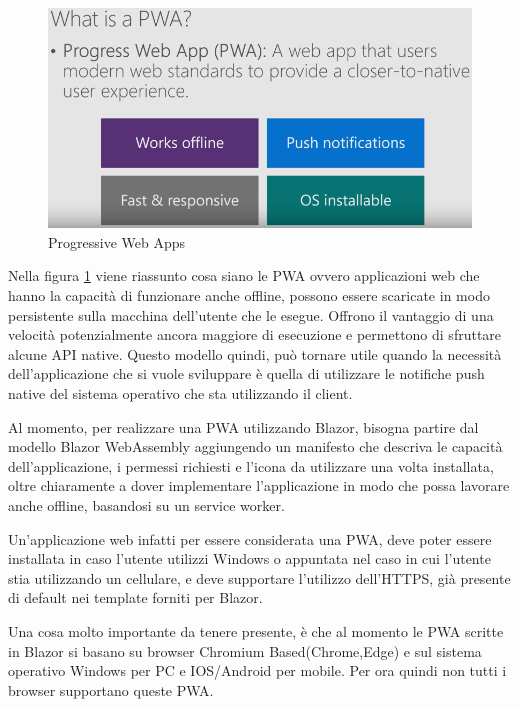 \begin{figure}[H]
	\centerline{\includegraphics[scale=0.5]{figure/ProgressiveWebApp.png}}
	\caption{Progressive Web Apps}
	\label{fig:WhatIsAPWA}
\end{figure}

Nella figura \ref{fig:WhatIsAPWA} viene riassunto cosa siano le PWA ovvero applicazioni web che hanno la capacit\`a di funzionare anche offline, possono essere scaricate in modo persistente sulla macchina dell'utente che le esegue.
Offrono il vantaggio di una velocit\`a potenzialmente ancora maggiore di esecuzione e permettono di sfruttare alcune API native.
Questo modello quindi, pu\`o tornare utile quando la necessit\`a dell'applicazione che si vuole sviluppare \`e quella di utilizzare le notifiche push native del sistema operativo che sta utilizzando il client.

Al momento, per realizzare una PWA utilizzando Blazor, bisogna partire dal modello Blazor WebAssembly aggiungendo un manifesto che descriva le capacit\`a dell'applicazione, i permessi richiesti e l'icona da utilizzare una volta installata, oltre chiaramente a dover implementare l'applicazione in modo che possa lavorare anche offline, basandosi su un service worker\cite{blazorPWA}.

Un'applicazione web infatti per essere considerata una PWA, deve poter essere installata in caso l'utente utilizzi Windows o appuntata nel caso in cui l'utente stia utilizzando un cellulare, e deve supportare l'utilizzo dell'HTTPS, gi\`a presente di default nei template forniti per Blazor.

Una cosa molto importante da tenere presente, \`e che al momento le PWA scritte in Blazor si basano su browser Chromium Based(Chrome,Edge) e sul sistema operativo Windows per PC e IOS/Android per mobile.
Per ora quindi non tutti i browser supportano queste PWA.

